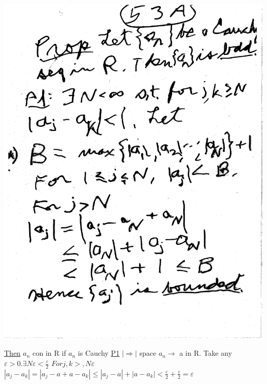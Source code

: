 \documentclass[10pt,a4paper]{article}
\begin{document}
{{\includegraphics[scale=.5]{Pages/LC_11}

\newpage
\underline{Then} ${a_n}$ con in R if ${a_n}$ is Cauchy
\underline{P1} $| \Rightarrow|$ space $a_n \longrightarrow$ a in R. Take any $\varepsilon > 0. \exists N \varepsilon < \frac {\varepsilon} {2}$ 
$For j,k>, N\varepsilon$ 
$|a_j-a_{k}|=|a_j-a+a-a_k|
\leq |a_j-a|+|a-a_k|
< \frac{\varepsilon}{2} + \frac{\varepsilon}{2}
=\varepsilon$

}}
\end{document}
